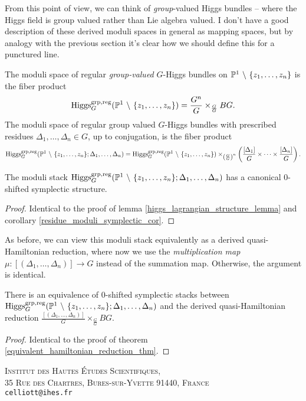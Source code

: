 \documentclass[10pt, oneside, a4paper]{article}
\begin{document}
From this point of view, we can think of \emph{group}-valued Higgs bundles -- where the Higgs field is group valued rather than Lie algebra valued.  I don't have a good description of these derived moduli spaces in general as mapping spaces, but by analogy with the previous section it's clear how we should define this for a punctured line.

\begin{definition}
The moduli space of regular \emph{group-valued} $G$-Higgs bundles on $\mathbb{P}^1 \ \backslash \  \{z_1, \ldots, z_n\}$ is the fiber product
\[\operatorname{Higgs}_G^{\text{grp,reg}}(\mathbb{P}^1 \ \backslash \  \{z_1, \ldots, z_n\}) = \frac {G^n}G \times_{\frac GG} BG.\]
The moduli space of regular group valued $G$-Higgs bundles with prescribed residues $\Delta_1, \ldots, \Delta_n \in G$, up to conjugation, is the fiber product
\[\operatorname{Higgs}_G^{\text{grp,reg}}(\mathbb{P}^1 \ \backslash \  \{z_1, \ldots, z_n\}; \Delta_1, \ldots, \Delta_n) = \operatorname{Higgs}_G^{\text{grp,reg}}(\mathbb{P}^1 \ \backslash \  \{z_1, \ldots, z_n\}) \times_{\left(\frac GG \right)^n} \left( \frac {[\Delta_1]}G \times \cdots \times \frac {[\Delta_n]}G \right).\]
\end{definition}

\begin{lemma}
The moduli stack $\operatorname{Higgs}_G^{\text{grp,reg}}(\mathbb{P}^1 \ \backslash \  \{z_1, \ldots, z_n\}; \Delta_1, \ldots, \Delta_n)$ has a canonical 0-shifted symplectic structure.
\end{lemma}

\begin{proof}
Identical to the proof of lemma \ref{higgs_lagrangian_structure_lemma} and corollary \ref{residue_moduli_symplectic_cor}.
\end{proof}

As before, we can view this moduli stack equivalently as a derived quasi-Hamiltonian reduction, where now we use the \emph{multiplication map} $\mu \colon [(\Delta_1, \ldots, \Delta_n)] \to G$ instead of the summation map.  Otherwise, the argument is identical.

\begin{theorem}
There is an equivalence of 0-shifted symplectic stacks between $\operatorname{Higgs}_G^{\text{grp,reg}}(\mathbb{P}^1 \ \backslash \  \{z_1, \ldots, z_n\}; \Delta_1, \ldots, \Delta_n)$ and the derived quasi-Hamiltonian reduction $\frac{[(\Delta_1, \ldots, \Delta_n)]}G \times_{\frac GG} BG$.
\end{theorem}

\begin{proof}
Identical to the proof of theorem \ref{equivalent_hamiltonian_reduction_thm}.
\end{proof}

 



\textsc{Institut des Hautes \'Etudes Scientifiques,}\\
\textsc{35 Rue des Chartres, Bures-sur-Yvette 91440, France} \\
\texttt{celliott@ihes.fr}\\
\end{document}
